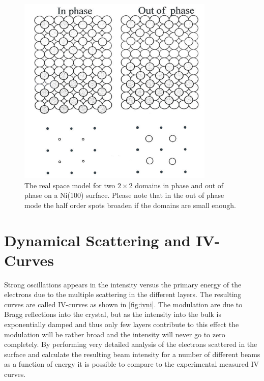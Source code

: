 \begin{figure}[h!]
	\begin{center}
	\includegraphics[scale=4]{figures/09_14.png}
	\caption{The real space model for two $2\times 2$ domains in phase and out of phase on a Ni(100) surface. Please note that in the out of phase mode the half order spots broaden if the domains are small enough.}
	\label{fig:22nileed}
	\end{center}
\end{figure}

\section{Dynamical Scattering and IV-Curves}
Strong oscillations appears in the intensity versus the  primary energy of the electrons due to the multiple scattering in the different layers. The resulting curves are called IV-curves as shown in \autoref{fig:ivni}.  The modulation are due to Bragg reflections into the crystal, but as the intensity into the bulk is exponentially damped and thus only  few layers contribute to this effect the modulation will be rather broad and the intensity will never go to zero completely.  By performing very detailed analysis of the electrons scattered in the surface and calculate the resulting beam intensity for a number of different beams as a function of energy it is possible to compare to the experimental measured IV curves.

